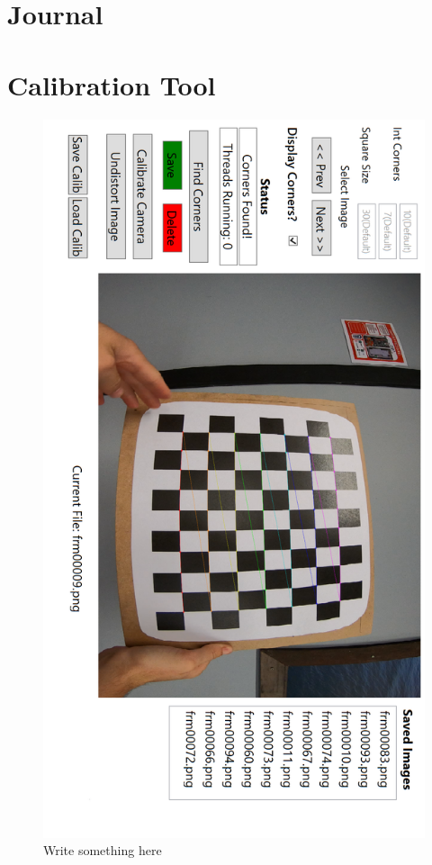 \documentclass{UoNMCHA}
\numberwithin{equation}{section}
\begin{document}
\newpage


\appendix
\newpage
\section{Journal}\label{app:Journal}
\newpage
\section{Calibration Tool}\label{app:calibrationTool}
\begin{figure}[ht]
    \begin{center}
        \includegraphics[width=.5\linewidth]{Figures/Calibration_Tool}
        \caption{Write something here}
        \label{fig:Calibration_Tool}
    \end{center}
\end{figure}
\newpage
\end{document}
